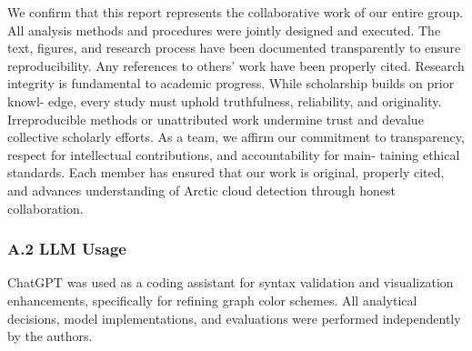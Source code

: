 \documentclass[11pt]{article}
\begin{document}
We confirm that this report represents the collaborative work of our
entire group. All analysis methods and procedures were jointly designed
and executed. The text, figures, and research process have been
documented transparently to ensure reproducibility. Any references to
others' work have been properly cited. Research integrity is fundamental
to academic progress. While scholarship builds on prior knowl- edge,
every study must uphold truthfulness, reliability, and originality.
Irreproducible methods or unattributed work undermine trust and devalue
collective scholarly efforts. As a team, we affirm our commitment to
transparency, respect for intellectual contributions, and accountability
for main- taining ethical standards. Each member has ensured that our
work is original, properly cited, and advances understanding of Arctic
cloud detection through honest collaboration.

\hypertarget{a.2-llm-usage}{%
\subsubsection{A.2 LLM Usage}\label{a.2-llm-usage}}

ChatGPT was used as a coding assistant for syntax validation and
visualization enhancements, specifically for refining graph color
schemes. All analytical decisions, model implementations, and
evaluations were performed independently by the authors.


    
    
    
\end{document}
